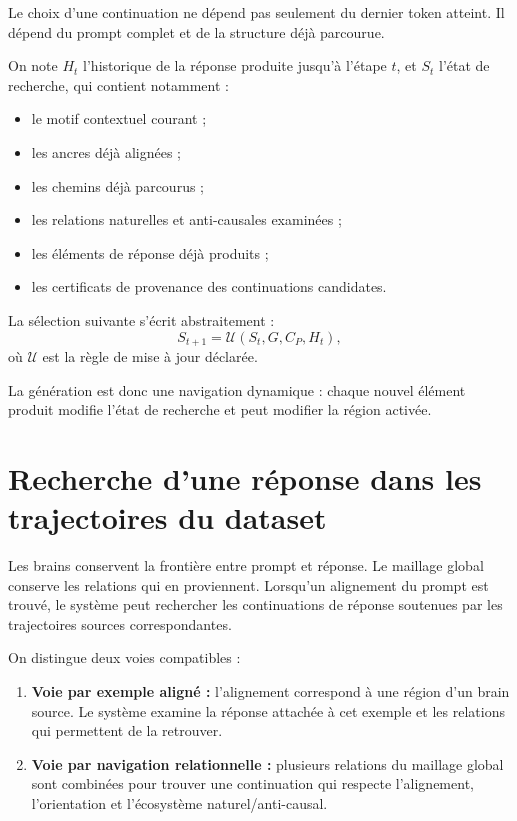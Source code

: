 \documentclass[11pt,a4paper]{report}
\theoremstyle{definition}
\theoremstyle{plain}
\theoremstyle{remark}
\begin{document}
Le choix d'une continuation ne dépend pas seulement du dernier
token atteint. Il dépend du prompt complet et de la structure
déjà parcourue.

On note \(H_t\) l'historique de la réponse produite jusqu'à
l'étape \(t\), et \(S_t\) l'état de recherche, qui contient
notamment :
\begin{itemize}
  \item le motif contextuel courant ;
  \item les ancres déjà alignées ;
  \item les chemins déjà parcourus ;
  \item les relations naturelles et anti-causales examinées ;
  \item les éléments de réponse déjà produits ;
  \item les certificats de provenance des continuations candidates.
\end{itemize}

La sélection suivante s'écrit abstraitement :
\[
S_{t+1}=
\mathcal{U}(S_t,G,C_P,H_t),
\]
où \(\mathcal{U}\) est la règle de mise à jour déclarée.

La génération est donc une navigation dynamique : chaque
nouvel élément produit modifie l'état de recherche et peut
modifier la région activée.

\section{Recherche d'une réponse dans les trajectoires du dataset}

Les brains conservent la frontière entre prompt et réponse.
Le maillage global conserve les relations qui en proviennent.
Lorsqu'un alignement du prompt est trouvé, le système peut
rechercher les continuations de réponse soutenues par les
trajectoires sources correspondantes.

On distingue deux voies compatibles :

\begin{enumerate}[label=\arabic*.]
  \item \textbf{Voie par exemple aligné :} l'alignement correspond
        à une région d'un brain source. Le système examine la
        réponse attachée à cet exemple et les relations qui
        permettent de la retrouver.
  \item \textbf{Voie par navigation relationnelle :} plusieurs
        relations du maillage global sont combinées pour trouver
        une continuation qui respecte l'alignement, l'orientation
        et l'écosystème naturel/anti-causal.
\end{enumerate}
\end{document}
